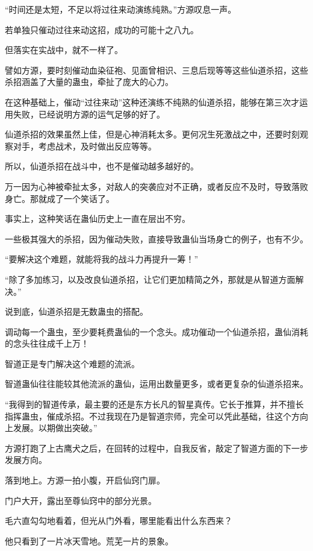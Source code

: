 
\begin{this_body}

“时间还是太短，不足以将过往来动演练纯熟。”方源叹息一声。

若单独只催动过往来动这招，成功的可能十之八九。

但落实在实战中，就不一样了。

譬如方源，要时刻催动血染征袍、见面曾相识、三息后现等等这些仙道杀招，这些杀招涵盖了大量的蛊虫，牵扯了庞大的心力。

在这种基础上，催动“过往来动”这种还演练不纯熟的仙道杀招，能够在第三次才运用失败，已经说明方源的运气足够的好了。

仙道杀招的效果虽然上佳，但是心神消耗太多。更何况生死激战之中，还要时刻观察对手，考虑战术，及时做出反应等等。

所以，仙道杀招在战斗中，也不是催动越多越好的。

万一因为心神被牵扯太多，对敌人的突袭应对不正确，或者反应不及时，导致落败身亡。那就成了一个笑话了。

事实上，这种笑话在蛊仙历史上一直在层出不穷。

一些极其强大的杀招，因为催动失败，直接导致蛊仙当场身亡的例子，也有不少。

“要解决这个难题，就能将我的战斗力再提升一筹！”

“除了多加练习，以及改良仙道杀招，让它们更加精简之外，那就是从智道方面解决。”

说到底，仙道杀招是无数蛊虫的搭配。

调动每一个蛊虫，至少要耗费蛊仙的一个念头。成功催动一个仙道杀招，蛊仙消耗的念头往往成千上万！

智道正是专门解决这个难题的流派。

智道蛊仙往往能较其他流派的蛊仙，运用出数量更多，或者更复杂的仙道杀招来。

“我得到的智道传承，最主要的还是东方长凡的智星真传。它长于推算，并不擅长指挥蛊虫，催成杀招。不过我现在乃是智道宗师，完全可以凭此基础，往这个方向上发展。以期做出突破。”

方源打跑了上古鹰犬之后，在回转的过程中，自我反省，敲定了智道方面的下一步发展方向。

落到地上。方源一拍小腹，开启仙窍门扉。

门户大开，露出至尊仙窍中的部分光景。

毛六直勾勾地看着，但光从门外看，哪里能看出什么东西来？

他只看到了一片冰天雪地。荒芜一片的景象。


\end{this_body}
